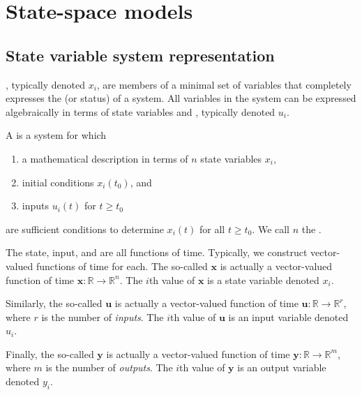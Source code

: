 \documentclass[dynamic_systems.tex]{subfiles}
\begin{document}
\chapter{State-space models}
\tags{}
\label{ch:state_space_models}

\section{State variable system representation}
\tags{}
\label{lec:state_variable_system_representation}

, typically denoted $x_i$, are members of a minimal set of variables that completely expresses the  (or status) of a system.
All variables in the system can be expressed algebraically in terms of state variables and , typically denoted $u_i$.
\tags{}

A  is a system for which 
\begin{enumerate}
	\item a mathematical description in terms of $n$ state variables $x_i$, 
	\item initial conditions $x_i(t_0)$, and 
	\item inputs $u_i(t)$ for $t\ge t_0$
\end{enumerate}
are sufficient conditions to determine $x_i(t)$ for all $t\ge t_0$.
We call $n$ the .

The state, input, and  are all functions of time.
Typically, we construct vector-valued functions of time for each.
The so-called  $\bm{x}$ is actually a vector-valued function of time $\bm{x}: \mathbb{R}\rightarrow\mathbb{R}^n$.
The $i$th value of $\bm{x}$ is a state variable denoted $x_i$.
\tags{}

Similarly, the so-called  $\bm{u}$ is actually a vector-valued function of time $\bm{u}: \mathbb{R}\rightarrow\mathbb{R}^r$, where $r$ is the number of \emph{inputs}.
The $i$th value of $\bm{u}$ is an input variable denoted $u_i$.
\tags{}

Finally, the so-called  $\bm{y}$ is actually a vector-valued function of time $\bm{y}: \mathbb{R}\rightarrow\mathbb{R}^m$, where $m$ is the number of \emph{outputs}.
The $i$th value of $\bm{y}$ is an output variable denoted $y_i$.
\tags{}
\end{document}
